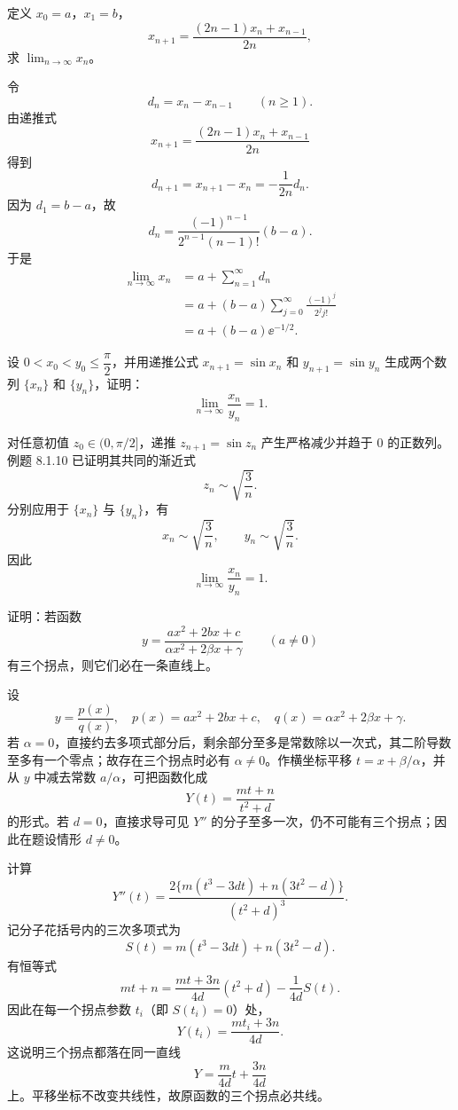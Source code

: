 \begin{xreferenceproblem}[5]
定义 $x_0=a$，$x_1=b$，
  \[
    x_{n+1}=\frac{(2n-1)x_n+x_{n-1}}{2n},
  \]
  求 $\displaystyle\lim_{n\to\infty}x_n$。
\end{xreferenceproblem}
\begin{xsolution}
令
\[
  d_n=x_n-x_{n-1}\qquad(n\ge1).
\]
由递推式
\[
  x_{n+1}=\frac{(2n-1)x_n+x_{n-1}}{2n}
\]
得到
\[
  d_{n+1}=x_{n+1}-x_n=-\frac1{2n}d_n.
\]
因为 $d_1=b-a$，故
\[
  d_n=\frac{(-1)^{n-1}}{2^{n-1}(n-1)!}(b-a).
\]
于是
\begin{align*}
  \lim_{n\to\infty}x_n
  &=a+\sum_{n=1}^\infty d_n\\
  &=a+(b-a)\sum_{j=0}^\infty\frac{(-1)^j}{2^j j!}\\
  &=\boxed{a+(b-a)\ee^{-1/2}}.
\end{align*}
\end{xsolution}


\begin{xreferenceproblem}[6]
设 $0<x_0<y_0\le\dfrac\pi2$，并用递推公式 $x_{n+1}=\sin x_n$ 和 $y_{n+1}=\sin y_n$ 生成两个数列 $\{x_n\}$ 和 $\{y_n\}$，证明：
  \[
    \lim_{n\to\infty}\frac{x_n}{y_n}=1.
  \]
\end{xreferenceproblem}
\begin{xsolution}
对任意初值 $z_0\in(0,\pi/2]$，递推 $z_{n+1}=\sin z_n$ 产生严格减少并趋于 0 的正数列。例题 8.1.10 已证明其共同的渐近式
\[
  z_n\sim\sqrt{\frac3n}.
\]
分别应用于 $\{x_n\}$ 与 $\{y_n\}$，有
\[
  x_n\sim\sqrt{\frac3n},
  \qquad
  y_n\sim\sqrt{\frac3n}.
\]
因此
\[
  \boxed{\lim_{n\to\infty}\frac{x_n}{y_n}=1}.
\]
\end{xsolution}


\begin{xreferenceproblem}[7]
证明：若函数
  \[
    y=\frac{ax^2+2bx+c}{\alpha x^2+2\beta x+\gamma}\qquad(a\ne0)
  \]
  有三个拐点，则它们必在一条直线上。
\end{xreferenceproblem}
\begin{xsolution}
设
\[
  y=\frac{p(x)}{q(x)},
  \quad
  p(x)=ax^2+2bx+c,
  \quad
  q(x)=\alpha x^2+2\beta x+\gamma.
\]
若 $\alpha=0$，直接约去多项式部分后，剩余部分至多是常数除以一次式，其二阶导数至多有一个零点；故存在三个拐点时必有 $\alpha\ne0$。作横坐标平移 $t=x+\beta/\alpha$，并从 $y$ 中减去常数 $a/\alpha$，可把函数化成
\[
  Y(t)=\frac{mt+n}{t^2+d}
\]
的形式。若 $d=0$，直接求导可见 $Y''$ 的分子至多一次，仍不可能有三个拐点；因此在题设情形 $d\ne0$。

计算
\[
  Y''(t)=
  \frac{2\{m(t^3-3dt)+n(3t^2-d)\}}{(t^2+d)^3}.
\]
记分子花括号内的三次多项式为
\[
  S(t)=m(t^3-3dt)+n(3t^2-d).
\]
有恒等式
\[
  mt+n
  =\frac{mt+3n}{4d}(t^2+d)-\frac1{4d}S(t).
\]
因此在每一个拐点参数 $t_i$（即 $S(t_i)=0$）处，
\[
  Y(t_i)=\frac{mt_i+3n}{4d}.
\]
这说明三个拐点都落在同一直线
\[
  Y=\frac{m}{4d}t+\frac{3n}{4d}
\]
上。平移坐标不改变共线性，故原函数的三个拐点必共线。
\end{xsolution}


